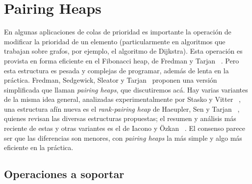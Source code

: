 \section{Pairing Heaps}
\label{sec:pairing-heaps}

  En algunas aplicaciones de colas de prioridad
  es importante la operación de modificar la prioridad de un elemento
  (particularmente en algoritmos que trabajan sobre grafos,
   por ejemplo,
   el algoritmo de Dijkstra).
  Esta operación es provista en forma eficiente en el Fibonacci heap,
  de Fredman y Tarjan~%
    \cite{fredman87:_fibonacci_heaps}.
  Pero esta estructura es pesada y complejas de programar,
  además de lenta en la práctica.
  Fredman, Sedgewick, Sleator y Tarjan~%
    \cite{fredman86:_pairing_heap}
  proponen una versión simplificada
  que llaman \emph{\foreignlanguage{english}{pairing heaps}},
  que discutiremos acá.
  Hay varias variantes de la misma idea general,
  analizadas experimentalmente por Stasko y Vitter~%
    \cite{stasko87:_pairing_heaps},
  una estructura afín nueva
  es el \emph{\foreignlanguage{english}{rank-pairing heap}}
  de Haeupler, Sen y Tarjan~%
    \cite{haeupler11:_rank_pairing_heaps},
  quienes revisan las diversas estructuras propuestas;
  el resumen y análisis más reciente de estas y otras variantes
  es el de Iacono y Özkan~%
    \cite{iacono14:_why_some_heaps_support_const}.
  El consenso parece ser que las diferencias son menores,
  con \emph{\foreignlanguage{english}{pairing heaps}}
  la más simple y algo más eficiente en la práctica.

\subsection{Operaciones a soportar}
\label{sec:operaciones-heap}

